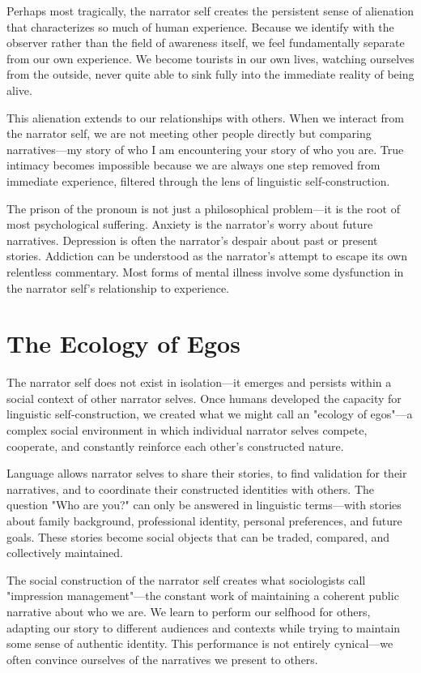 Perhaps most tragically, the narrator self creates the persistent sense of alienation that characterizes so much of human experience. Because we identify with the observer rather than the field of awareness itself, we feel fundamentally separate from our own experience. We become tourists in our own lives, watching ourselves from the outside, never quite able to sink fully into the immediate reality of being alive.

This alienation extends to our relationships with others. When we interact from the narrator self, we are not meeting other people directly but comparing narratives—my story of who I am encountering your story of who you are. True intimacy becomes impossible because we are always one step removed from immediate experience, filtered through the lens of linguistic self-construction.

The prison of the pronoun is not just a philosophical problem—it is the root of most psychological suffering. Anxiety is the narrator's worry about future narratives. Depression is often the narrator's despair about past or present stories. Addiction can be understood as the narrator's attempt to escape its own relentless commentary. Most forms of mental illness involve some dysfunction in the narrator self's relationship to experience.

\section{The Ecology of Egos}

The narrator self does not exist in isolation—it emerges and persists within a social context of other narrator selves. Once humans developed the capacity for linguistic self-construction, we created what we might call an "ecology of egos"—a complex social environment in which individual narrator selves compete, cooperate, and constantly reinforce each other's constructed nature.

Language allows narrator selves to share their stories, to find validation for their narratives, and to coordinate their constructed identities with others. The question "Who are you?" can only be answered in linguistic terms—with stories about family background, professional identity, personal preferences, and future goals. These stories become social objects that can be traded, compared, and collectively maintained.

The social construction of the narrator self creates what sociologists call "impression management"—the constant work of maintaining a coherent public narrative about who we are. We learn to perform our selfhood for others, adapting our story to different audiences and contexts while trying to maintain some sense of authentic identity. This performance is not entirely cynical—we often convince ourselves of the narratives we present to others.

